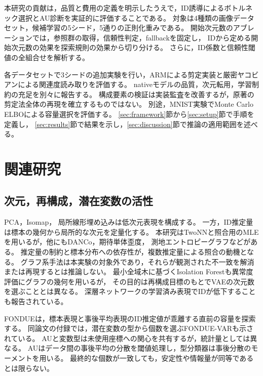 \documentclass[11pt,a4paper]{ltjsarticle}
\begin{document}
本研究の貢献は，品質と費用の定義を明示したうえで，ID誘導によるボトルネック選択とAU診断を実証的に評価することである。
対象は4種類の画像データセット，候補学習の5シード，5通りの正則化重みである。
開始次元数のアブレーションでは，参照群の取得，信頼性判定，fallbackを固定し，
IDから定める開始次元数の効果を探索規則の効果から切り分ける。
さらに，ID係数と信頼性閾値の全組合せを解析する。

各データセットで3シードの追加実験を行い，ARMによる剪定実装と厳密ヤコビアンによる関連度読み取りを評価する。
nativeモデルの品質，次元転用，学習制約の充足を別々に報告する。
構成要素の検証は実装監査を改善するが，原著の剪定法全体の再現を確立するものではない。
別途，MNIST実験でMonte Carlo ELBOによる容量選択を評価する。
\ref{sec:framework}節から\ref{sec:setup}節で手順を定義し，
\ref{sec:results}節で結果を示し，\ref{sec:discussion}節で推論の適用範囲を述べる。

\section{関連研究}\label{sec:related}

\subsection{次元，再構成，潜在変数の活性}
PCA\cite{tippingbishop1999ppca}，Isomap\cite{tenenbaum2000isomap}，
局所線形埋め込み\cite{roweis2000lle}は低次元表現を構成する。
一方，ID推定量は標本の幾何から局所的な次元を定量化する。
本研究はTwoNNと照合用のMLEを用いるが，他にもDANCo，期待単体歪度，
測地エントロピーグラフなどがある\cite{ceruti2014danco,johnsson2015ess,costa2004geodesic}。
推定量の制約と標本分布への依存性が，複数推定量による照合の動機となる\cite{camastra2016intrinsic,allegra2020data}。
グラフ系手法は本実験の対象外であり，それらが観測された不一致を解消または再現するとは推論しない。
最小全域木に基づくIsolation Forestも異常度評価にグラフの幾何を用いる\cite{galka2022isolation}が，
その目的は再構成目標のもとでVAEの次元数を選ぶこととは異なる。
深層ネットワークの学習済み表現でIDが低下することも報告されている\cite{ansuini2019intrinsic,pope2021intrinsic}。

FONDUE\cite{bonheme2022fondue}は，標本表現と事後平均表現のID推定値が乖離する直前の容量を探索する。
同論文の付録では，潜在変数の型から個数を選ぶFONDUE-VARも示されている。
AUと変数型は未使用座標への関心を共有するが，統計量としては異なる。
AUはデータ間の事後平均の分散を閾値処理し，型分類器は事後分散のモーメントを用いる\cite{bonheme2023active}。
最終的な個数が一致しても，安定性や情報量が同等であるとは限らない。
\end{document}
